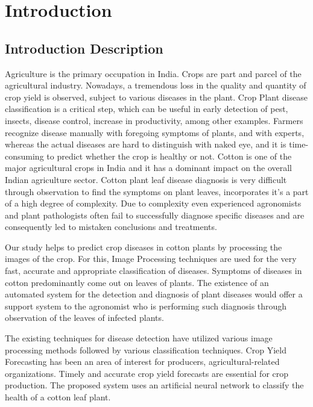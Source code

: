 \graphicspath{ {images/} }
\chapter{Introduction}
\thispagestyle{empty}
\section{Introduction Description}
\par \hspace{5mm} Agriculture is the primary occupation in India. Crops are part and parcel of the agricultural industry. Nowadays, a tremendous loss in the quality and quantity of crop yield is observed, subject to various diseases in the plant. Crop Plant disease classification is a critical step, which can be useful in early detection of pest, insects, disease control, increase in productivity, among other examples. Farmers recognize disease manually with foregoing symptoms of plants, and with experts, whereas the actual diseases are hard to distinguish with naked eye, and it is time-consuming to predict whether the crop is healthy or not. Cotton is one of the major agricultural crops in India and it has a dominant impact on the overall Indian agriculture sector. Cotton plant leaf disease diagnosis is very difficult through observation to find the symptoms on plant leaves, incorporates it's a part of a high degree of complexity. Due to complexity even experienced agronomists and plant pathologists often fail to successfully diagnose specific diseases and are consequently led to mistaken conclusions and treatments.

\par Our study helps to predict crop diseases in cotton plants by processing the images of the crop. For this, Image Processing techniques are used for the very fast, accurate and appropriate classification of diseases. Symptoms of diseases in cotton predominantly come out on leaves of plants. The existence of an automated system for the detection and diagnosis of plant diseases would offer a support system to the agronomist who is performing such diagnosis through observation of the leaves of infected plants. 

\par The existing techniques for disease detection have utilized various image processing methods followed by various classification techniques. Crop Yield Forecasting has been an area of interest for producers, agricultural-related organizations. Timely and accurate crop yield forecasts are essential for crop production. The proposed system uses an artificial neural network to classify the health of a cotton leaf plant.   


